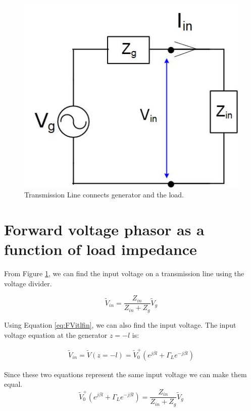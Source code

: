 \documentclass{ximera}
\begin{document}
\begin{figure}[htbp]
\begin{center}
\includegraphics[scale=0.3]{../jpg/trlineEqCirc.jpg}
\end{center}
\caption{Transmission Line connects generator and the load.}
\label{fig:FVTRLineEqCirc}
\end{figure}



\section{Forward voltage phasor as a function of load impedance}


From Figure \ref{fig:FVTRLineEqCirc}, we can find the input voltage on a transmission line using the voltage divider.

\begin{equation}
\tilde{V}_{in}= \frac{Z_{in}}{Z_{in}+Z_g} \tilde{V}_g
\end{equation} 

Using Equation \ref{eq:FVitlfin}, we can also find the input voltage.
The input voltage equation at the generator $z=-l$ is:

\begin{eqnarray}
\tilde{V}_{in}=\tilde{V}(z=-l)= \tilde{V}_0^+ (e^{j \beta l} + \Gamma_L  e^{-j \beta l } )
\end{eqnarray}

Since these two equations represent the same input voltage we can make them equal.
\begin{equation}
\tilde{V}_0^+ (e^{j \beta l} + \Gamma_L  e^{-j \beta l }) = \frac{Z_{in}}{Z_{in}+Z_g} \tilde{V}_g
\end{equation}
\end{document}
